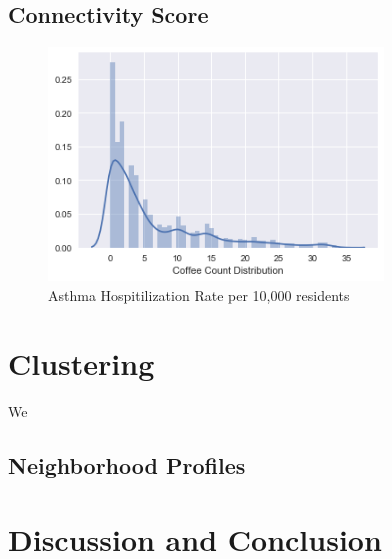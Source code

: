 \documentclass[conference]{IEEEtran}
\begin{document}
\subsection{Connectivity Score}



\begin{figure}[!t]
\centering
\includegraphics[width=3.5in]{coffee_count}
\caption{Asthma Hospitilization Rate per 10,000 residents}
\label{fig_coffee_count}
\end{figure}


\section{Clustering}
We

\subsection{Neighborhood Profiles}


\section{Discussion and Conclusion}


%
%
\end{document}
